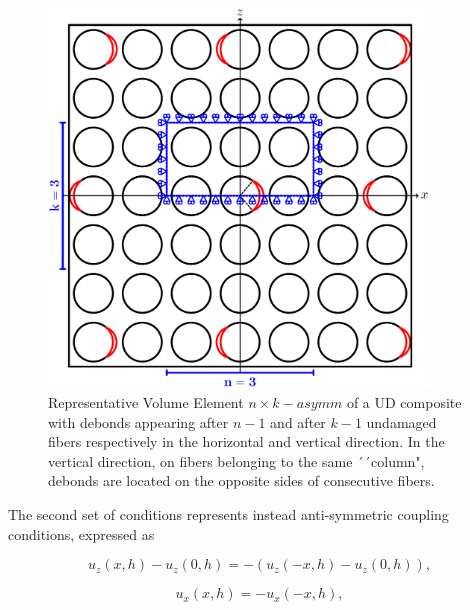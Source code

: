 \begin{figure}[!htb]
\centering
  \includegraphics[width=0.9\textwidth]{paperD/asymm.pdf}
\caption{Representative Volume Element $n \times k-asymm$ of a UD composite with debonds appearing after $n-1$ and after $k-1$ undamaged fibers respectively in the horizontal and vertical direction. In the vertical direction, on fibers belonging to the same ´´column", debonds are located on the opposite sides of consecutive fibers.}\label{chap3:paperD:fig:asymm-rve}
\end{figure}

The second set of conditions represents instead anti-symmetric coupling conditions, expressed as

\begin{equation}
u_{z}\left(x,h\right)-u_{z}\left(0,h\right)=-\left(u_{z}\left(-x,h\right)-u_{z}\left(0,h\right)\right),
\end{equation}

\begin{equation}
u_{x}\left(x,h\right)=-u_{x}\left(-x,h\right),
\end{equation}

